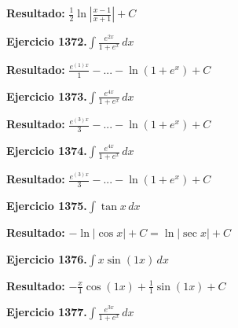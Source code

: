 \documentclass[10pt,a4paper]{article}
\begin{document}
\begin{solbox}
\textbf{Resultado:} \(\displaystyle \frac{1}{2}\ln\left|\frac{x-1}{x+1}\right| + C\)
\end{solbox}

\newpage
\begin{ejbox}
\textbf{Ejercicio 1372.}\quad $\int \frac{e^{2x}}{1+e^{x}}\,dx$
\end{ejbox}

\begin{solbox}
\textbf{Resultado:} \(\displaystyle \frac{e^{(1)x}}{1} - ... - \ln(1+e^x) + C\)
\end{solbox}

\begin{ejbox}
\textbf{Ejercicio 1373.}\quad $\int \frac{e^{4x}}{1+e^{x}}\,dx$
\end{ejbox}

\begin{solbox}
\textbf{Resultado:} \(\displaystyle \frac{e^{(3)x}}{3} - ... - \ln(1+e^x) + C\)
\end{solbox}

\begin{ejbox}
\textbf{Ejercicio 1374.}\quad $\int \frac{e^{4x}}{1+e^{x}}\,dx$
\end{ejbox}

\begin{solbox}
\textbf{Resultado:} \(\displaystyle \frac{e^{(3)x}}{3} - ... - \ln(1+e^x) + C\)
\end{solbox}

\newpage
\begin{ejbox}
\textbf{Ejercicio 1375.}\quad $\int \tan x\,dx$
\end{ejbox}

\begin{solbox}
\textbf{Resultado:} \(\displaystyle -\ln|\cos x| + C = \ln|\sec x| + C\)
\end{solbox}

\begin{ejbox}
\textbf{Ejercicio 1376.}\quad $\int x \sin(1x)\,dx$
\end{ejbox}

\begin{solbox}
\textbf{Resultado:} \(\displaystyle -\frac{x}{1}\cos(1x) + \frac{1}{1}\sin(1x) + C\)
\end{solbox}

\begin{ejbox}
\textbf{Ejercicio 1377.}\quad $\int \frac{e^{3x}}{1+e^{x}}\,dx$
\end{ejbox}
\end{document}

